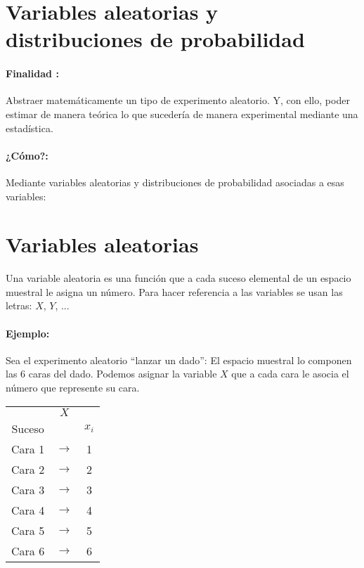 \section{Variables aleatorias y distribuciones de probabilidad}

\paragraph{Finalidad :} Abstraer matemáticamente un tipo de experimento aleatorio. Y, con ello, poder estimar de manera teórica lo que sucedería de manera experimental mediante una estadística. 

\paragraph{¿Cómo?:} Mediante variables aleatorias y distribuciones de probabilidad asociadas a esas variables:

\section{Variables aleatorias} Una variable aleatoria es una función que a cada suceso
elemental de un espacio muestral le asigna un número. Para hacer referencia a las variables se usan las letras: $X$, $Y$, ...

\paragraph{Ejemplo:} Sea el experimento aleatorio “lanzar un dado”: El espacio muestral lo componen las 6 caras del dado. Podemos asignar la variable $X$ que a cada cara le asocia el número que represente su cara.

\begin{center}
\begin{tabular}{ccc}
 & $X$ &  \\
Suceso &  &  $x_i$\\ \hline 
Cara 1 & $\rightarrow$ & 1 \\ 
Cara 2 & $\rightarrow$ & 2 \\ 
Cara 3 & $\rightarrow$ & 3 \\ 
Cara 4 & $\rightarrow$ & 4 \\ 
Cara 5 & $\rightarrow$ & 5 \\ 
Cara 6 & $\rightarrow$ & 6 \\ 
\end{tabular} 
\end{center}

